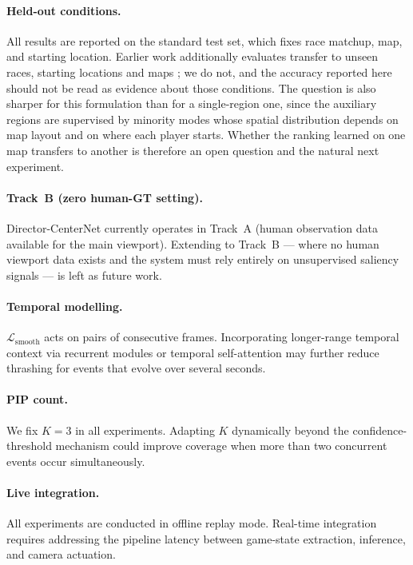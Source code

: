 \documentclass[preprint,12pt]{elsarticle}
\begin{document}
\paragraph{Held-out conditions.} All results are reported on the standard test
set, which fixes race matchup, map, and starting location. Earlier work
additionally evaluates transfer to unseen races, starting locations and maps
\cite{joo2023learning, anonymous2025kbrs}; we do not, and the accuracy reported
here should not be read as evidence about those conditions. The question is
also sharper for this formulation than for a single-region one, since the
auxiliary regions are supervised by minority modes whose spatial distribution
depends on map layout and on where each player starts. Whether the ranking
learned on one map transfers to another is therefore an open question and the
natural next experiment.

\paragraph{Track~B (zero human-GT setting).} Director-CenterNet currently
operates in Track~A (human observation data available for the main viewport).
Extending to Track~B — where no human viewport data exists and the system
must rely entirely on unsupervised saliency signals — is left as future work.

\paragraph{Temporal modelling.} $\mathcal{L}_{\text{smooth}}$ acts on 
pairs of consecutive frames. Incorporating longer-range temporal context via 
recurrent modules or temporal self-attention may further reduce thrashing 
for events that evolve over several seconds.

\paragraph{PIP count.} We fix $K=3$ in all experiments. Adapting $K$ 
dynamically beyond the confidence-threshold mechanism could improve coverage 
when more than two concurrent events occur simultaneously.

\paragraph{Live integration.} All experiments are conducted in offline 
replay mode. Real-time integration requires addressing the pipeline latency 
between game-state extraction, inference, and camera actuation.
\end{document}
